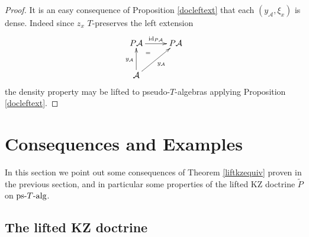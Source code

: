 \documentclass[a4paper,oneside,english]{amsart}
\numberwithin{equation}{section}
\numberwithin{figure}{section}
\theoremstyle{plain}
\theoremstyle{definition}
\theoremstyle{remark}
\theoremstyle{definition}
\theoremstyle{plain}
\theoremstyle{plain}
\theoremstyle{plain}
\begin{document}
\begin{proof}
It is an easy consequence of Proposition \ref{docleftext} that each
$\left(y_{\mathcal{A}},\xi_{x}\right)$ is dense. Indeed since $z_{x}$
$T$-preserves the left extension
\[
\xymatrix@=1em{P\mathcal{A}\ar[rr]^{\textnormal{id}_{P\mathcal{A}}} &  & P\mathcal{A}\\
 & \ar@{}[ul]|-{=}\\
\mathcal{A}\ar[uu]^{y_{\mathcal{A}}}\ar[uurr]_{y_{\mathcal{A}}}
}
\]
the density property may be lifted to pseudo-$T$-algebras applying
Proposition \ref{docleftext}.
\end{proof}

\section{Consequences and Examples\label{consequencesandexamples}}

In this section we point out some consequences of Theorem \ref{liftkzequiv}
proven in the previous section, and in particular some properties
of the lifted KZ doctrine $\widetilde{P}$ on $\textnormal{ps-}T\textnormal{-alg}$. 

\subsection{The lifted KZ doctrine}
\end{document}
